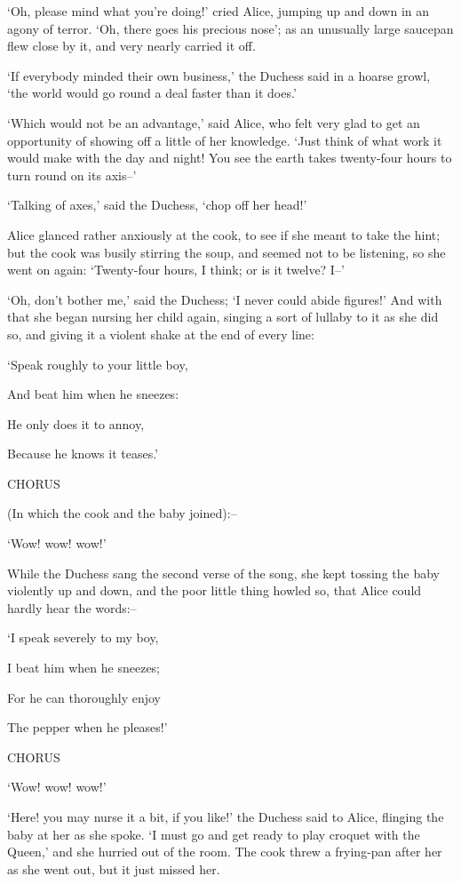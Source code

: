\documentclass[statementpaper,twoside,openany]{memoir}
\begin{document}
`Oh, please mind what you're doing!' cried Alice, jumping up and down in an agony of terror. `Oh, there goes his precious nose'; as an unusually large saucepan flew close by it, and very nearly carried it off.

`If everybody minded their own business,' the Duchess said in a hoarse growl, `the world would go round a deal faster than it does.'

`Which would not be an advantage,' said Alice, who felt very glad to get an opportunity of showing off a little of her knowledge. `Just think of what work it would make with the day and night! You see the earth takes twenty-four hours to turn round on its axis--'

`Talking of axes,' said the Duchess, `chop off her head!'

Alice glanced rather anxiously at the cook, to see if she meant to take the hint; but the cook was busily stirring the soup, and seemed not to be listening, so she went on again: `Twenty-four hours, I think; or is it twelve? I--'

`Oh, don't bother me,' said the Duchess; `I never could abide figures!' And with that she began nursing her child again, singing a sort of lullaby to it as she did so, and giving it a violent shake at the end of every line:

`Speak roughly to your little boy,

And beat him when he sneezes:

He only does it to annoy,

Because he knows it teases.'

CHORUS

(In which the cook and the baby joined):--

`Wow! wow! wow!'

While the Duchess sang the second verse of the song, she kept tossing the baby violently up and down, and the poor little thing howled so, that Alice could hardly hear the words:--

`I speak severely to my boy,

I beat him when he sneezes;

For he can thoroughly enjoy

The pepper when he pleases!'

CHORUS

`Wow! wow! wow!'

`Here! you may nurse it a bit, if you like!' the Duchess said to Alice, flinging the baby at her as she spoke. `I must go and get ready to play croquet with the Queen,' and she hurried out of the room. The cook threw a frying-pan after her as she went out, but it just missed her.
\end{document}
